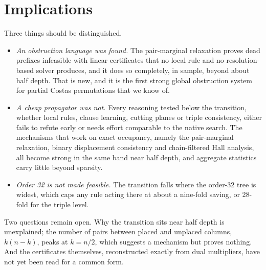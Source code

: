 \section{Implications}
\label{sec:implications}
Three things should be distinguished.
\begin{itemize}
\item \emph{An obstruction language was found.} The pair-marginal relaxation proves dead prefixes infeasible
with linear certificates that no local rule and no resolution-based solver produces, and it does so
completely, in sample, beyond about half depth. That is new, and it is the first strong global obstruction
system for partial Costas permutations that we know of.
\item \emph{A cheap propagator was not.} Every reasoning tested below the transition, whether local
rules, clause learning, cutting planes or triple consistency, either fails to refute early or needs effort
comparable to the native search. The mechanisms that work on exact occupancy, namely the pair-marginal
relaxation, binary displacement consistency and chain-filtered Hall analysis, all become strong in the
same band near half depth, and aggregate statistics carry little beyond sparsity.
\item \emph{Order 32 is not made feasible.} The transition falls where the order-32 tree is widest, which caps
any rule acting there at about a nine-fold saving, or 28-fold for the triple level.
\end{itemize}
Two questions remain open. Why the transition sits near half depth is unexplained; the number of pairs
between placed and unplaced columns, $k(n-k)$, peaks at $k=n/2$, which suggests a mechanism but proves
nothing. And the certificates themselves, reconstructed exactly from dual multipliers, have not yet been
read for a common form.
